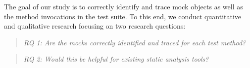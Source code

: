 
The goal of our study is to correctly identify and trace mock objects as well as the method invocations in the test suite. To this end, we conduct quantitative and qualitative research focusing on two research questions:

\begin{quote}
	\emph{RQ 1: Are the mocks correctly identified and traced for each test method?}
\end{quote}

\begin{quote}
	\emph{RQ 2: Would this be helpful for existing static analysis tools?}
\end{quote}

